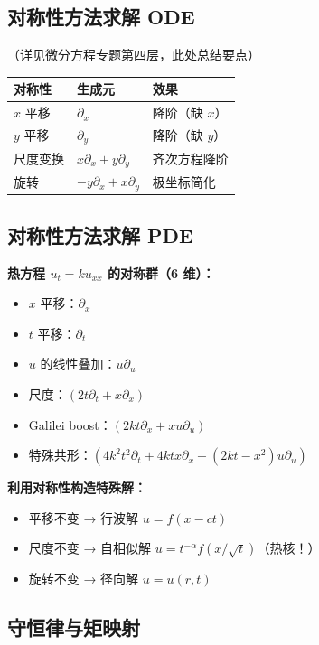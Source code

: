 \subsection{对称性方法求解 ODE}

（详见微分方程专题第四层，此处总结要点）

\begin{center}
\begin{tabular}{L{4cm}L{4cm}L{4cm}}
\toprule
\textbf{对称性} & \textbf{生成元} & \textbf{效果} \\
\midrule
$x$ 平移 & $\partial_x$ & 降阶（缺 $x$） \\
$y$ 平移 & $\partial_y$ & 降阶（缺 $y$） \\
尺度变换 & $x\partial_x + y\partial_y$ & 齐次方程降阶 \\
旋转 & $-y\partial_x + x\partial_y$ & 极坐标简化 \\
\bottomrule
\end{tabular}
\end{center}

\subsection{对称性方法求解 PDE}

\textbf{热方程 $u_t = ku_{xx}$ 的对称群（6 维）：}
\begin{itemize}
  \item $x$ 平移：$\partial_x$
  \item $t$ 平移：$\partial_t$
  \item $u$ 的线性叠加：$u\partial_u$
  \item 尺度：$(2t\partial_t + x\partial_x)$
  \item Galilei boost：$(2kt\partial_x + xu\partial_u)$
  \item 特殊共形：$(4k^2t^2\partial_t + 4ktx\partial_x + (2kt - x^2)u\partial_u)$
\end{itemize}

\textbf{利用对称性构造特殊解：}
\begin{itemize}
  \item 平移不变 → 行波解 $u = f(x - ct)$
  \item 尺度不变 → 自相似解 $u = t^{-\alpha}f(x/\sqrt{t})$（热核！）
  \item 旋转不变 → 径向解 $u = u(r, t)$
\end{itemize}

\subsection{守恒律与矩映射}

